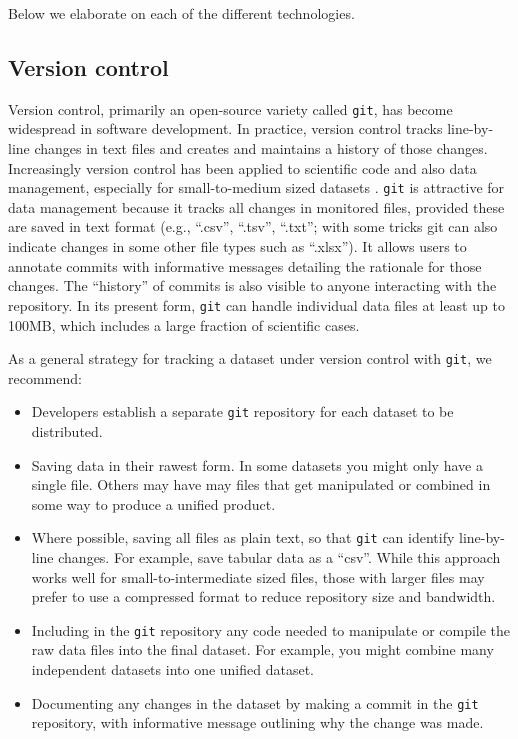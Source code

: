 \documentclass[a4paper,num-refs]{oup-contemporary}
\begin{document}
Below we elaborate on each of the different technologies.

\subsection{Version control}

Version control, primarily an open-source variety called \texttt{git}, has become widespread in software development. In practice, version control tracks line-by-line changes in text files and creates and maintains a history of those changes. Increasingly version control has been applied to scientific code and also data management, especially for small-to-medium sized datasets \cite{Ram-2013, Perkel-2016, Lowndes-2017}. \texttt{git} is attractive for data management because it tracks all changes in monitored files, provided these are saved in text format (e.g., ``.csv'', ``.tsv'', ``.txt''; with some tricks git can also indicate changes in some other file types such as ``.xlsx''). It  allows users to annotate commits with informative messages detailing the rationale for those changes.  The ``history'' of commits is also visible to anyone interacting with the repository. In its present form, \texttt{git} can handle individual data files at least up to 100MB, which includes a large fraction of scientific cases.

As a general strategy for tracking a dataset under version control with \texttt{git}, we recommend:
\begin{itemize}
  \item Developers establish a separate \texttt{git} repository for each dataset to be distributed.
  \item Saving data in their rawest form. In some datasets you might only have a single file. Others may have may files that get manipulated or combined in some way to produce a unified product.
  \item Where possible, saving all files as plain text, so that \texttt{git} can identify line-by-line changes. For example, save tabular data as a ``csv''. While this approach works well for small-to-intermediate sized files, those with larger files may prefer to use a compressed format to reduce repository size and bandwidth. 
  \item Including in the \texttt{git} repository any code needed to manipulate or compile the raw data files into the final dataset. For example, you might combine many independent datasets into one unified dataset.
  \item Documenting any changes in the dataset by making a commit in the \texttt{git} repository, with informative message outlining why the change was made.
\end{itemize}
\end{document}
